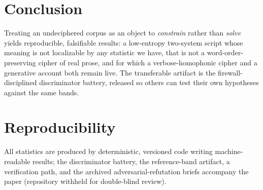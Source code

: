\documentclass[11pt]{article}
\begin{document}
\section{Conclusion}
Treating an undeciphered corpus as an object to \emph{constrain} rather than \emph{solve}
yields reproducible, falsifiable results: a low-entropy two-system script whose meaning is not
localizable by any statistic we have, that is not a word-order-preserving cipher of real prose,
and for which a verbose-homophonic cipher and a generative account both remain live. The
transferable artifact is the firewall-disciplined discriminator battery, released so others can
test their own hypotheses against the same bands.

\section*{Reproducibility}
All statistics are produced by deterministic, versioned code writing machine-readable results;
the discriminator battery, the reference-band artifact, a verification path, and the archived
adversarial-refutation briefs accompany the paper (repository withheld for double-blind review).



\end{document}
